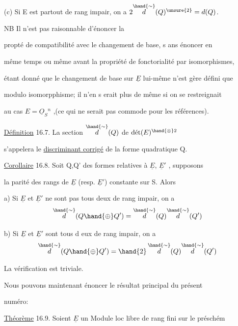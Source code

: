 
(c) Si E est partout de rang impair, on a $2\overset{\hand{\sim}}{d}(Q)^{\unsure{2}} = d(Q)$.



 \quad NB Il n'est pas raisonnable d'énoncer la

propté de compatibilité avec le changement de base, s ans énoncer en

même temps\hand{,} ou même avant\hand{,} la propriété de fonctorialité par isomorphismes,

étant donné que le changement de base sur $\underline{E}$ lui-même n'est gère défini que

modulo isomorpphisme; il n'en s erait plus de même si on se restreignait

au cas $E = \underline{O}_S{}^n$ ,(ce qui ne serait pas commode pour les références).

 \quad \uline{Définition} 16.7. La section $\overset{\hand{\sim}}{d}(Q)$ de $\text{dét}(E)^{\hand{\otimes}2}$

s'appelera le \uline{discriminant corrigé} de la forme quadratique Q.

\uline{Corollaire} 16.8. Soit Q,Q' des formes relatives à $\underline{E}$, $\underline{E}'$ , supposons

la parité des rangs de $\underline{E}$ (resp. $\underline{E}'$) constante sur S. Alors

a) Si $\underline{E}$ et $\underline{E}'$ ne sont pas tous deux de rang impair, on a
\[ \overset{\hand{\sim}}{d}(Q \hand{\oplus} Q') = \overset{\hand{\sim}}{d}(Q)\overset{\hand{\sim}}{d}(Q') \]

b) Si $\underline{E}$ et $\underline{E}'$ sont tous d eux de rang impair, on a
\[ \overset{\hand{\sim}}{d}(Q \hand{\oplus} Q') = \hand{2}\,\overset{\hand{\sim}}{d}(Q)\overset{\hand{\sim}}{d}(Q') \]

La vérification est triviale.

Nous pouvons maintenant énoncer le résultat principal du présent

numéro:

\uline{Théorème} 16.9. Soient $\underline{E}$ un Module loc libre de rang fini sur le préschém

